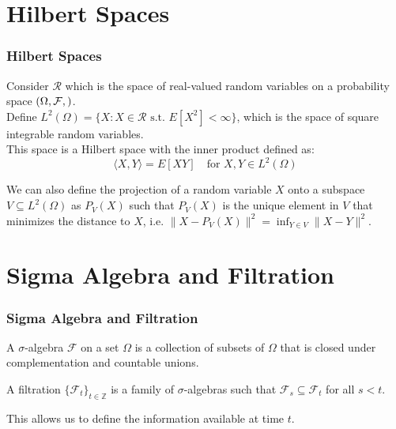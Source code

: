 \documentclass{beamer}
\let\P\relax
\newcommand{\P}{\mathbb{P}}
\newcommand{\Z}{\mathbb{Z}}
\begin{document}
\section{Hilbert Spaces}
\begin{frame}
    \frametitle{Hilbert Spaces}
    Consider $\mathscr{R}$ which is the space of real-valued random variables on a probability space $(\Omega, \mathcal{F}, \P)$. \\
    Define $L^2(\Omega) = \{X: X \in \mathscr{R} \text{ s.t. } E[X^2] < \infty\}$, which is the space of square integrable random variables.\\
    This space is a Hilbert space with the inner product defined as:
        $$\langle X, Y \rangle = E[XY] \quad \text{for } X, Y \in L^2(\Omega)$$
    \begin{definition}
        We can also define the projection of a random variable $X$ onto a subspace $V \subseteq L^2(\Omega)$ as $P_V(X)$ 
        such that $P_V(X)$ is the unique element in $V$ that minimizes the distance to $X$, i.e. $\|X - P_V(X)\|^2 = \inf_{Y \in V} \|X - Y\|^2$.
    \end{definition}
\end{frame}

\section{Sigma Algebra and Filtration}
\begin{frame}
    \frametitle{Sigma Algebra and Filtration}
    \begin{definition}
        A $\sigma$-algebra $\mathcal{F}$ on a set $\Omega$ is a collection of subsets of $\Omega$ that is closed under complementation and countable unions.
    \end{definition}
    \begin{definition}[Filtration]
        A filtration $\{\mathcal{F}_t\}_{t \in \Z}$ is a family of $\sigma$-algebras such that $\mathcal{F}_s \subseteq \mathcal{F}_t$ for all $s < t$.
    \end{definition}
    This allows us to define the information available at time $t$.
\end{frame}
\end{document}
